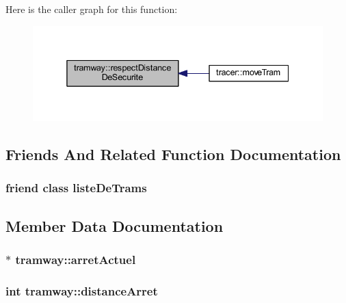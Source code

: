 Here is the caller graph for this function\+:
\nopagebreak
\begin{figure}[H]
\begin{center}
\leavevmode
\includegraphics[width=338pt]{classtramway_ac11a2d8761217b5db1253cc35ea67a66_icgraph}
\end{center}
\end{figure}




\subsection{Friends And Related Function Documentation}
\subsubsection[{\texorpdfstring{liste\+De\+Trams}{listeDeTrams}}]{\setlength{\rightskip}{0pt plus 5cm}friend class {\bf liste\+De\+Trams}\hspace{0.3cm}{\ttfamily [friend]}}\hypertarget{classtramway_a769de17fc42804fb0d2a6751abb27e2f}{}\label{classtramway_a769de17fc42804fb0d2a6751abb27e2f}


\subsection{Member Data Documentation}
\subsubsection[{\texorpdfstring{arret\+Actuel}{arretActuel}}]{$\ast$ tramway\+::arret\+Actuel}\hypertarget{classtramway_a316032ab458b4ccf96b3f3f1bf327ee2}{}\label{classtramway_a316032ab458b4ccf96b3f3f1bf327ee2}
\subsubsection[{\texorpdfstring{distance\+Arret}{distanceArret}}]{\setlength{\rightskip}{0pt plus 5cm}int tramway\+::distance\+Arret}\hypertarget{classtramway_a85b44399cbbf04ec765d114465a4aa1f}{}\label{classtramway_a85b44399cbbf04ec765d114465a4aa1f}
